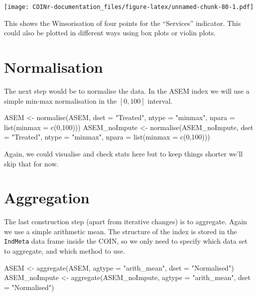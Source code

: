 \documentclass[
]{book}
\newenvironment{Shaded}{\begin{snugshade}}{\end{snugshade}}
\newcommand{\AttributeTok}[1]{\textcolor[rgb]{0.77,0.63,0.00}{#1}}
\newcommand{\DecValTok}[1]{\textcolor[rgb]{0.00,0.00,0.81}{#1}}
\newcommand{\FunctionTok}[1]{\textcolor[rgb]{0.00,0.00,0.00}{#1}}
\newcommand{\NormalTok}[1]{#1}
\newcommand{\OtherTok}[1]{\textcolor[rgb]{0.56,0.35,0.01}{#1}}
\newcommand{\StringTok}[1]{\textcolor[rgb]{0.31,0.60,0.02}{#1}}
\begin{document}
\texttt{[image: COINr-documentation\_files/figure-latex/unnamed-chunk-80-1.pdf]}

This shows the Winsorisation of four points for the ``Services'' indicator. This could also be plotted in different ways using box plots or violin plots.

\hypertarget{normalisation-1}{%
\section{Normalisation}\label{normalisation-1}}

The next step would be to normalise the data. In the ASEM index we will use a simple min-max normalisation in the \([0, 100]\) interval.

\begin{Shaded}
\begin{Highlighting}[]
\NormalTok{ASEM }\OtherTok{\textless{}{-}} \FunctionTok{normalise}\NormalTok{(ASEM, }\AttributeTok{dset =} \StringTok{"Treated"}\NormalTok{, }\AttributeTok{ntype =} \StringTok{"minmax"}\NormalTok{, }\AttributeTok{npara =} \FunctionTok{list}\NormalTok{(}\AttributeTok{minmax =} \FunctionTok{c}\NormalTok{(}\DecValTok{0}\NormalTok{,}\DecValTok{100}\NormalTok{)))}
\NormalTok{ASEM\_noImpute }\OtherTok{\textless{}{-}} \FunctionTok{normalise}\NormalTok{(ASEM\_noImpute, }\AttributeTok{dset =} \StringTok{"Treated"}\NormalTok{, }\AttributeTok{ntype =} \StringTok{"minmax"}\NormalTok{, }\AttributeTok{npara =} \FunctionTok{list}\NormalTok{(}\AttributeTok{minmax =} \FunctionTok{c}\NormalTok{(}\DecValTok{0}\NormalTok{,}\DecValTok{100}\NormalTok{)))}
\end{Highlighting}
\end{Shaded}

Again, we could visualise and check stats here but to keep things shorter we'll skip that for now.

\hypertarget{aggregation-1}{%
\section{Aggregation}\label{aggregation-1}}

The last construction step (apart from iterative changes) is to aggregate. Again we use a simple arithmetic mean. The structure of the index is stored in the \texttt{IndMeta} data frame inside the COIN, so we only need to specify which data set to aggregate, and which method to use.

\begin{Shaded}
\begin{Highlighting}[]
\NormalTok{ASEM }\OtherTok{\textless{}{-}} \FunctionTok{aggregate}\NormalTok{(ASEM, }\AttributeTok{agtype =} \StringTok{"arith\_mean"}\NormalTok{, }\AttributeTok{dset =} \StringTok{"Normalised"}\NormalTok{)}
\NormalTok{ASEM\_noImpute }\OtherTok{\textless{}{-}} \FunctionTok{aggregate}\NormalTok{(ASEM\_noImpute, }\AttributeTok{agtype =} \StringTok{"arith\_mean"}\NormalTok{, }\AttributeTok{dset =} \StringTok{"Normalised"}\NormalTok{)}
\end{Highlighting}
\end{Shaded}
\end{document}
